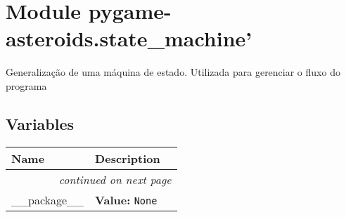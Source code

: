 %
%
%


\section{Module pygame-asteroids.state\_machine'}

    \label{pygame-asteroids:state_machine'}
Generalização de uma máquina de estado. Utilizada para gerenciar o fluxo do
programa



  \subsection{Variables}

    \vspace{-1cm}
\hspace{\varindent}\begin{longtable}{|p{\varnamewidth}|p{\vardescrwidth}|l}
\cline{1-2}
\cline{1-2} \centering \textbf{Name} & \centering \textbf{Description}& \\
\cline{1-2}
\endhead\cline{1-2}\multicolumn{3}{r}{\small\textit{continued on next page}}\\\endfoot\cline{1-2}
\endlastfoot\raggedright \_\-\_\-p\-a\-c\-k\-a\-g\-e\-\_\-\_\- & \raggedright \textbf{Value:} 
{\tt None}&\\
\cline{1-2}
\end{longtable}



